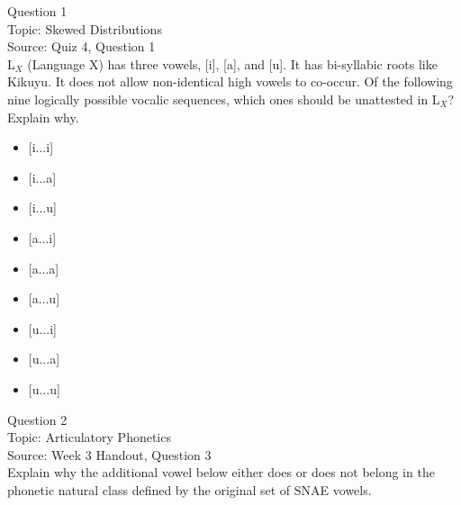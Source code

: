 \documentclass[12pt]{article}
\begin{document}
\begin{center}
\textbf{{\color{violet}{\HUGE 20201118 Wednesday\\}}}

\textbf{{\color{violet}{\HUGE ALL EXAMS\\}}}

\end{center}
\newpage

\begin{center}
\textbf{{\color{blue}{\HUGE START OF EXAM\\}}}

\textbf{{\color{blue}{\HUGE Student ID: 61058\\}}}

\textbf{{\color{blue}{\HUGE 9:00\\}}}

\end{center}
\newpage

{\large Question 1}\\

Topic: Skewed Distributions\\
Source: Quiz 4, Question 1\\

L$_X$ (Language X) has three vowels, [i], [a], and [u]. It has bi-syllabic roots like Kikuyu. It does not allow non-identical high vowels to co-occur. Of the following nine logically possible vocalic sequences, which ones should be unattested in L$_X$? Explain why.\\

\begin{itemize} \item {[i...i]} \item {[i...a]} \item {[i...u]} \item {[a...i]} \item {[a...a]} \item {[a...u]} \item {[u...i]} \item {[u...a]} \item {[u...u]} \end{itemize}


\newpage

{\large Question 2}\\

Topic: Articulatory Phonetics\\
Source: Week 3 Handout, Question 3\\

Explain why the additional vowel below either does or does not belong in the phonetic natural class defined by the original set of SNAE vowels.\\
\end{document}
